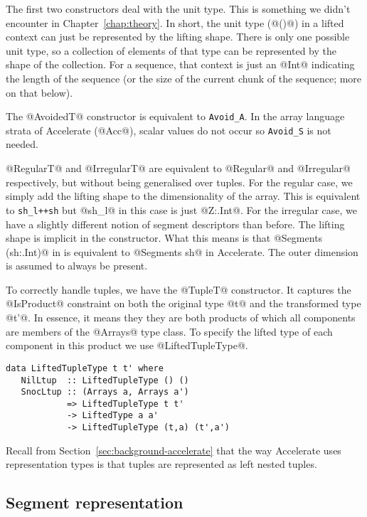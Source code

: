 The first two constructors deal with the unit type. This is something we didn't encounter in Chapter~\ref{chap:theory}. In short, the unit type (@()@) in a lifted context can just be represented by the lifting shape. There is only one possible unit type, so a collection of elements of that type can be represented by the shape of the collection. For a sequence, that context is just an @Int@ indicating the length of the sequence (or the size of the current chunk of the sequence; more on that below).

The @AvoidedT@ constructor is equivalent to \lstinline[style=ndp]{Avoid_A}. In the array language strata of Accelerate (@Acc@), scalar values do not occur so \lstinline[style=ndp]{Avoid_S} is not needed.

@RegularT@ and @IrregularT@ are equivalent to @Regular@ and @Irregular@ respectively, but without being generalised over tuples. For the regular case, we simply add the lifting shape to the dimensionality of the array. This is equivalent to \lstinline[style=ndp]{sh_l++sh} but @sh_l@ in this case is just @Z:.Int@. For the irregular case, we have a slightly different notion of segment descriptors than before. The lifting shape is implicit in the constructor. What this means is that @Segments (sh:.Int)@ in \ndp{} is equivalent to @Segments sh@ in Accelerate. The outer dimension is assumed to always be present.

To correctly handle tuples, we have the @TupleT@ constructor. It captures the @IsProduct@ constraint on both the original type @t@ and the transformed type @t'@. In essence, it means they they are both products of which all components are members of the @Arrays@ type class. To specify the lifted type of each component in this product we use @LiftedTupleType@.
%
\begin{lstlisting}
data LiftedTupleType t t' where
   NilLtup  :: LiftedTupleType () ()
   SnocLtup :: (Arrays a, Arrays a')
            => LiftedTupleType t t'
            -> LiftedType a a'
            -> LiftedTupleType (t,a) (t',a')
\end{lstlisting}
%
Recall from Section~\ref{sec:background-accelerate} that the way Accelerate uses representation types is that tuples are represented as left nested tuples.

\subsection{Segment representation}

